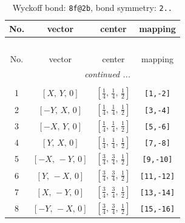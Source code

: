 \documentclass[fleqn,8pt]{jsarticle}
\begin{document}
\begin{longtable}{cccc}
\caption{Wyckoff bond: {\tt 8f@2b}, bond symmetry: {\tt 2..}}
 \\
 \hline \hline
No. & vector & center & mapping \\ \hline \endfirsthead

\multicolumn{3}{l}{\tablename\ \thetable{}} \\
 \hline \hline
No. & vector & center & mapping \\ \hline \endhead

 \hline \hline
\multicolumn{3}{r}{\footnotesize\it continued ...} \\ \endfoot

 \hline \hline
\multicolumn{3}{r}{} \\ \endlastfoot

1 & $\left[ X,\, Y,\, 0 \right]$ & $\left[ \frac{1}{4},\, \frac{1}{4},\, \frac{1}{2} \right]$ & {\tt [1,-2]} \\ \hline
2 & $\left[ - Y,\, X,\, 0 \right]$ & $\left[ \frac{1}{4},\, \frac{1}{4},\, \frac{1}{2} \right]$ & {\tt [3,-4]} \\ \hline
3 & $\left[ - X,\, Y,\, 0 \right]$ & $\left[ \frac{1}{4},\, \frac{1}{4},\, \frac{1}{2} \right]$ & {\tt [5,-6]} \\ \hline
4 & $\left[ Y,\, X,\, 0 \right]$ & $\left[ \frac{1}{4},\, \frac{1}{4},\, \frac{1}{2} \right]$ & {\tt [7,-8]} \\ \hline
5 & $\left[ - X,\, - Y,\, 0 \right]$ & $\left[ \frac{3}{4},\, \frac{3}{4},\, \frac{1}{2} \right]$ & {\tt [9,-10]} \\ \hline
6 & $\left[ Y,\, - X,\, 0 \right]$ & $\left[ \frac{3}{4},\, \frac{3}{4},\, \frac{1}{2} \right]$ & {\tt [11,-12]} \\ \hline
7 & $\left[ X,\, - Y,\, 0 \right]$ & $\left[ \frac{3}{4},\, \frac{3}{4},\, \frac{1}{2} \right]$ & {\tt [13,-14]} \\ \hline
8 & $\left[ - Y,\, - X,\, 0 \right]$ & $\left[ \frac{3}{4},\, \frac{3}{4},\, \frac{1}{2} \right]$ & {\tt [15,-16]} \\
\end{longtable}
\renewcommand{\arraystretch}{1.2}
\end{document}
